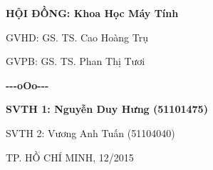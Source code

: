 \documentclass[12pt,a4paper,twoside]{report}
\begin{document}
\vspace{2cm}

\begin{minipage}{0.35\textwidth}
\phantom{ab1}
\end{minipage}
\begin{minipage}{0.65\textwidth}
\large\bfseries
HỘI ĐỒNG: Khoa Học Máy Tính\par
GVHD: GS. TS. Cao Hoàng Trụ\par
GVPB: GS. TS. Phan Thị Tươi\par
\end{minipage}

\vspace{0.2cm}
{\large\bfseries\centering-{}-{}-oOo-{}-{}-\par}
\begin{minipage}{0.35\textwidth}
\phantom{ab1}
\end{minipage}
\begin{minipage}{0.65\textwidth}
\large\bfseries
SVTH 1: Nguyễn Duy Hưng (51101475)\par
SVTH 2: Vương Anh Tuấn (51104040)\par
\end{minipage}

\vspace{3.2cm}
\large TP. HỒ CHÍ MINH, 12/2015
\end{document}
